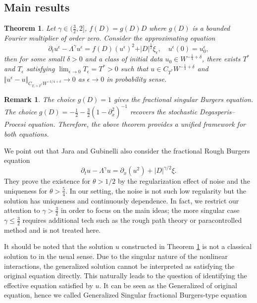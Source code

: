 \documentclass{article}
\newtheorem{theorem}{Theorem}[section]
\newtheorem{remark}{Remark}[section]
\numberwithin{equation}{section}
\newcommand{\p}{\partial}
\begin{document}
\subsection{Main results}
\begin{theorem}\label{th;main result}
	Let $\gamma\in(\frac{3}{2},2]$, $f(D)=g(D)D$ where $g(D)$ is a bounded Fourier multiplier of order zero. Consider the approximating equation
	\begin{equation}\label{eq;Burgers;app}
		\p_t u^\epsilon-\Lambda^\gamma u^\epsilon=f(D)(u^\epsilon)^2+\vert D\vert^{\frac{1}{2}}\xi_\epsilon,\quad u^\epsilon(0)=u^\epsilon_0,
	\end{equation}
	then for some small $\delta>0$ and a class of initial data $u_0\in W^{-\frac{1}{4}+\delta}$, there exists $T^*$ and $T_\epsilon$ satisfying $\lim_{\epsilon\to0}T_\epsilon= T^*>0$ such that $u\in C_{T^*}W^{-\frac{1}{4}+\delta}$ and  $\Vert u^\epsilon - u\Vert_{C_{T_\epsilon\wedge T^*}W^{-1/4+\delta}}\to 0$ as $\epsilon\to 0$ in probability sense. 
\end{theorem}
\begin{remark}
The choice $g(D)=1$ gives the fractional singular Burgers equation. The choice $g(D)=-\frac12-\frac32(1-\partial_x^2)^{-1}$ recovers the stochastic Degasperis--Procesi equation. Therefore, the above theorem provides a unified framework for both equations.
\end{remark}
\par We point out that Jara and Gubinelli also consider the fractional Rough Burgers equation
\begin{equation}
    \p_t u-\Lambda^\gamma u=\p_x(u^2)+|D|^{\gamma/2}\xi.
\end{equation}
They prove the existence for $\theta>1/2$ by the regularization effect of noise and the uniqueness for $\theta>\frac{5}{4}$. In our setting, the noise is not such low regularity but the solution has uniqueness and continuously dependence. In fact, we restrict our attention to $\gamma>\frac
32$ in order to focus on the main ideas; the more singular case $\gamma\leq\frac{3}{2}$ requires additional tech such as the rough path theory or paracontrolled method and is not treated here. 
\par It should be noted that the solution $u$ constructed in Theorem \ref{th;main result} is not a classical solution to in the usual sense. Due to the singular nature of the nonlinear interactions, the generalized solution cannot be interpreted as satisfying the original equation directly. This naturally leads to the question of identifying the effective equation satisfied by $u$.  It can be seen as the Generalized of original equation, hence we called Generalized Singular fractional Burgers-type equation 
\end{document}
